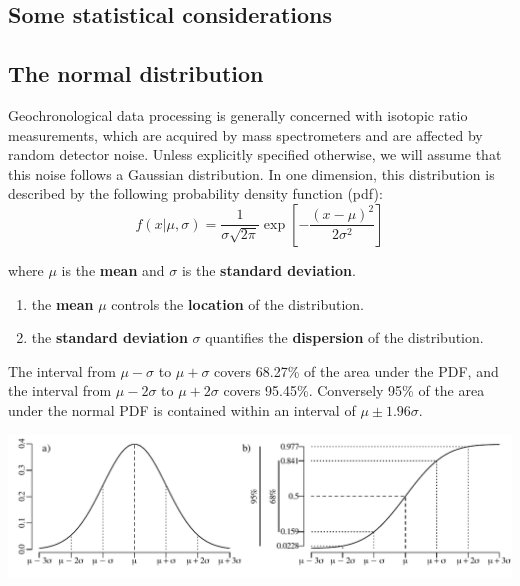 \begin{refsection}
\chapter{Some statistical considerations}\label{ch:formats}

\section{The normal distribution}
\label{sec:Gauss}

Geochronological data processing is generally concerned with isotopic
ratio measurements, which are acquired by mass spectrometers and are
affected by random detector noise. Unless explicitly specified
otherwise, we will assume that this noise follows a Gaussian
distribution. In one dimension, this distribution is described by the
following probability density function (pdf):
\begin{equation}
  f(x|\mu,\sigma) = \frac{1}{\sigma\sqrt{2\pi}}
  \exp\!\left[-\frac{(x-\mu)^2}{2\sigma^2}\right]
  \label{eq:gauss}
\end{equation}

\noindent where $\mu$ is the \textbf{mean} and $\sigma$ is the
\textbf{standard deviation}.

\begin{enumerate}
\item the \textbf{mean} $\mu$ controls the \textbf{location} of the
  distribution.
\item the \textbf{standard deviation} $\sigma$ quantifies the
  \textbf{dispersion} of the distribution.
\end{enumerate}

The interval from $\mu-\sigma$ to $\mu+\sigma$ covers 68.27\% of the
area under the PDF, and the interval from $\mu-2\sigma$ to
$\mu+2\sigma$ covers 95.45\%. Conversely 95\% of the area under the
normal PDF is contained within an interval of $\mu\pm{1.96}\sigma$.

\noindent\includegraphics[width=\textwidth]{../figures/2sigma.pdf}
\begingroup {}
\label{fig:2sigma}
\endgroup


\end{refsection}
